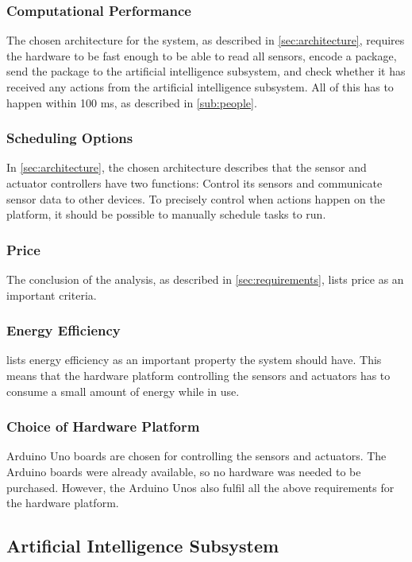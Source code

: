 \subsubsection{Computational Performance}
The chosen architecture for the system, as described in \cref{sec:architecture}, requires the hardware to be fast enough to be able to read all sensors, encode a package, send the package to the artificial intelligence subsystem, and check whether it has received any actions from the artificial intelligence subsystem. All of this has to happen within 100 ms, as described in \cref{sub:people}.

\subsubsection{Scheduling Options}
In \cref{sec:architecture}, the chosen architecture describes that the sensor and actuator controllers have two functions: Control its sensors and communicate sensor data to other devices. To precisely control when actions happen on the platform, it should be possible to manually schedule tasks to run.

\subsubsection{Price}
The conclusion of the analysis, as described in \cref{sec:requirements}, lists price as an important criteria.

\subsubsection{Energy Efficiency}
 lists energy efficiency as an important property the system should have. This means that the hardware platform controlling the sensors and actuators has to consume a small amount of energy while in use.

\subsubsection{Choice of Hardware Platform}
Arduino Uno boards are chosen for controlling the sensors and actuators. The Arduino boards were already available, so no hardware was needed to be purchased. However, the Arduino Unos also fulfil all the above requirements for the hardware platform.

\subsection{Artificial Intelligence Subsystem}

